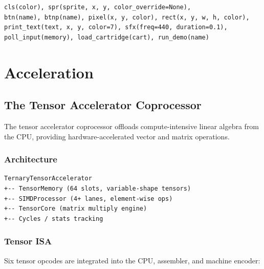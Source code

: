 \documentclass[12pt,a4paper,twoside]{book}
\theoremstyle{trinarytheorem}
\theoremstyle{trinarydefinition}
\begin{document}
\begin{verbatim}
cls(color), spr(sprite, x, y, color_override=None),
btn(name), btnp(name), pixel(x, y, color), rect(x, y, w, h, color),
print_text(text, x, y, color=7), sfx(freq=440, duration=0.1),
poll_input(memory), load_cartridge(cart), run_demo(name)
\end{verbatim}

\part{Acceleration}

\chapter{The Tensor Accelerator Coprocessor}
\label{ch:accelerator}

The tensor accelerator coprocessor offloads compute-intensive linear algebra from the
CPU, providing hardware-accelerated vector and matrix operations.

\section{Architecture}

\begin{verbatim}
TernaryTensorAccelerator
+-- TensorMemory (64 slots, variable-shape tensors)
+-- SIMDProcessor (4+ lanes, element-wise ops)
+-- TensorCore (matrix multiply engine)
+-- Cycles / stats tracking
\end{verbatim}

\section{Tensor ISA}

Six tensor opcodes are integrated into the CPU, assembler, and machine encoder:
\end{document}
